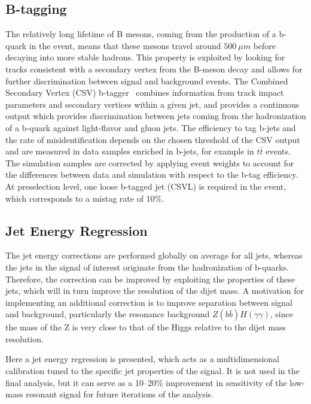\subsection{B-tagging\label{subsec:btag}}

The relatively long lifetime of B mesons, coming from the production of a b-quark in the event,
means that these mesons travel around $500~\mu m$ before decaying into more stable hadrons.
This property is exploited by looking for tracks consistent with a secondary vertex from
the B-meson decay and allows for further discrimination between signal and background events.
The Combined Secondary Vertex (CSV) b-tagger~\cite{BTV} combines
information from track impact parameters and secondary vertices within a given jet, and
provides a continuous output which provides discrimination between jets coming from the
hadronization of a b-quark against light-flavor and gluon jets.
The efficiency to tag b-jets and the rate of misidentification depends on the chosen threshold
of the CSV output and are measured in data samples enriched in b-jets, for example in $t\bar{t}$ events.
The simulation samples are corrected by applying event weights to account for the
differences between data and simulation with respect to the b-tag efficiency.
At preselection level, one loose b-tagged jet (CSVL) is required in the event, which corresponds to
a mistag rate of 10\%.

\subsection{Jet Energy Regression}

The jet energy corrections are performed globally on average for all jets, whereas the jets in
the signal of interest originate from the hadronization of b-quarks. Therefore, the correction
can be improved by exploiting the properties of these jets, which will in turn improve the resolution
of the dijet mass. A motivation for implementing an additional correction is to improve separation
between signal and background, particularly the resonance background $Z(b\bar{b})H(\gamma\gamma)$,
since the mass of the Z is very close to that of the Higgs relative to the dijet mass resolution.

Here a jet energy regression is presented, which acts as a multidimensional calibration tuned to the
specific jet properties of the signal. It is not used in the final analysis, but it can serve
as a 10--20\% improvement in sensitivity of the low-mass resonant signal
for future iterations of the analysis.

